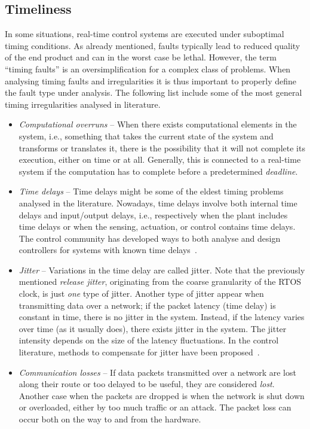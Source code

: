 \subsection{Timeliness}%
\label{sec:intro:timeliness}%
%
In some situations, real-time control systems are executed under suboptimal timing conditions.
As already mentioned, faults typically lead to reduced quality of the end product and can in the worst case be lethal.
However, the term ``timing faults'' is an oversimplification for a complex class of problems.
When analysing timing faults and irregularities it is thus important to properly define the fault type under analysis.
The following list include some of the most general timing irregularities analysed in literature.
%
\begin{itemize}
    \item \emph{Computational overruns} -- When there exists computational elements in the system, i.e., something that takes the current state of the system and transforms or translates it, there is the possibility that it will not complete its execution, either on time or at all. %
        Generally, this is connected to a real-time system if the computation has to complete before a predetermined \emph{deadline}.

    \item \emph{Time delays} -- Time delays might be some of the eldest timing problems analysed in the literature.
        Nowadays, time delays involve both internal time delays and input/output delays, i.e., respectively when the plant includes time delays or when the sensing, actuation, or control contains time delays.
        The control community has developed ways to both analyse and design controllers for systems with known time delays~\cite{Mirkin:2004, Mirkin:2005}.

    \item \emph{Jitter} -- Variations in the time delay are called jitter.
        Note that the previously mentioned \emph{release jitter}, originating from the coarse granularity of the RTOS clock, is just \emph{one} type of jitter.
        Another type of jitter appear when transmitting data over a network; if the packet latency (time delay) is constant in time, there is no jitter in the system.
        Instead, if the latency varies over time (as it usually does), there exists jitter in the system.
        The jitter intensity depends on the size of the latency fluctuations.
        In the control literature, methods to compensate for jitter have been proposed~\cite{Cervin:2004}.

    \item \emph{Communication losses} -- If data packets transmitted over a network are lost along their route or too delayed to be useful, they are considered \emph{lost}.
        Another case when the packets are dropped is when the network is shut down or overloaded, either by too much traffic or an attack.
        The packet loss can occur both on the way to and from the hardware.
\end{itemize}
